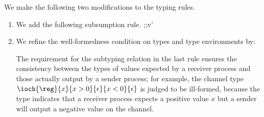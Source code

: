 We make the following two modifications to the typing rules.
\begin{enumerate}
\item
  We add the following subsumption rule.
                {\env;\predenv;\chenv\p v\COL \chty'}

  \item
    We refine the well-formedness condition on types and type environments by:
{}

\infrule{
   \FV(\predenv) \subseteq \dom(\env)
}
{\tyenvok{\env}{\predenv}{\emptyset}}


{}

The requirement for the subtyping relation in the last rule
 ensures the consistency between the types of
values expected by a receiver process and those actually output by a sender process;
for example, the channel type
\(\ioch{\reg}{x}{x>0}{\epsilon}{x<0}{\epsilon}\) is judged to be ill-formed,
because the type indicates that a receiver process expects a positive value \(x\) but 
a sender will output a negative value on the channel.
\end{enumerate}

